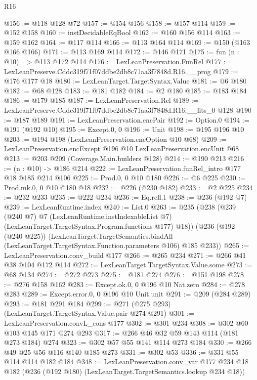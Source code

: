 \begin{lexlean}{R16}
\begin{coremodule}
@156 := @118 @128 @72
@157 := @154 @156
@158 := @157 @114
@159 := @152 @158
@160 := instDecidableEqBool
@162 := @160 @156 @114
@163 := @159 @162
@164 := @117 @114
@166 := @113 @164 @114
@169 := @150 (@163 @166 @166)
@171 := @113 @169 @114
@172 := @146 @171
@175 := fun (n : @10) => @113 @172 @114
@176 := LexLeanPreservation.FunRel
@177 := LexLeanPreserve.Cddc319f71f07ddbe2db8c71aa3f7848d.R16.__prog
@179 := @176 @177 @18
@180 := LexLeanTarget.TargetSyntax.Value
@181 := @6 @180
@182 := @68 @128
@183 := @181 @182
@184 := @2 @180
@185 := @183 @184
@186 := @179 @185
@187 := LexLeanPreservation.Rel
@189 := LexLeanPreserve.Cddc319f71f07ddbe2db8c71aa3f7848d.R16.__fits_0 @128
@190 := @187 @189
@191 := LexLeanPreservation.encPair
@192 := Option.{0}
@194 := @191 (@192 @10)
@195 := Except.{0, 0}
@196 := Unit
@198 := @195 @196 @10
@203 := @194 @198 (LexLeanPreservation.encOption @10 @68)
@209 := LexLeanPreservation.encExcept @196 @10 LexLeanPreservation.encUnit @68
@213 := @203 @209 (Coverage.Main.builders @128)
@214 := @190 @213
@216 := (n : @10) -> @186 @214
@222 := LexLeanPreservation.funRel_intro @177 @18 @185 @214 @106
@225 := Prod.{0, 0} @10 @180
@226 := @6 @225
@230 := Prod.mk.{0, 0} @10 @180 @18
@232 := @226 (@230 @182)
@233 := @2 @225
@234 := @232 @233
@235 := @222 @234
@236 := Eq.refl.{1}
@238 := @236 (@192 @7)
@239 := LexLeanRuntime.index
@240 := List.{0}
@263 := @235
    (@238
      (@239
        (@240 @7)
        @7
        (LexLeanRuntime.instIndexableList @7)
        (LexLeanTarget.TargetSyntax.Program.functions @177)
        @18))
    (@236
      (@192 (@240 @225))
      (LexLeanTarget.TargetSemantics.bindAll
        (LexLeanTarget.TargetSyntax.Function.parameters @106)
        @185
        @233))
@265 := LexLeanPreservation.conv_build @177
@266 := @265 @234
@271 := @266 @41 @38 @104 @172 @114
@272 := LexLeanTarget.TargetSyntax.Value.some
@273 := @68 @134
@274 := @272 @273
@275 := @181 @274
@276 := @151 @198
@278 := @276 @158 @162
@283 := Except.ok.{0, 0} @196 @10 Nat.zero
@284 := @278 @283
@289 := Except.error.{0, 0} @196 @10 Unit.unit
@291 := @209 (@284 @289)
@293 := @181 @291 @184
@299 := @271 (@275 @293) (LexLeanTarget.TargetSyntax.Value.pair @274 @291)
@301 := LexLeanPreservation.convL_cons @177
@302 := @301 @234
@308 := @302 @60 @103 @145 @171 @274 @293
@317 := @266 @46 @32 @59 @143 @114 (@181 @273 @184) @274
@323 := @302 @57 @55 @141 @114 @273 @184
@330 := @266 @49 @25 @56 @116 @140 @185 @273
@331 := @302 @53
@336 := @331 @55 @114 @114 @182 @184
@348 := LexLeanPreservation.conv_var
    @177
    @234
    @18
    @182
    (@236 (@192 @180) (LexLeanTarget.TargetSemantics.lookup @234 @18))

\end{coremodule}
\end{lexlean}
